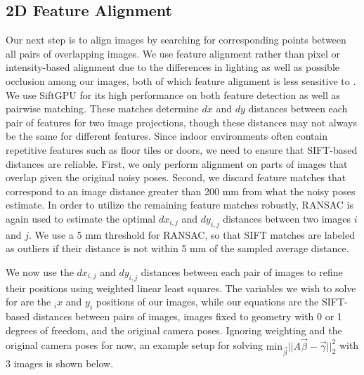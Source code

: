 \documentclass[]{spie}  %
\begin{document}
\subsection{2D Feature Alignment}
\label{sec:robustSIFTFeatureMatching}
Our next step is to align images by searching for corresponding points
between all pairs of overlapping images. We use feature alignment
rather than pixel or intensity-based alignment due to the differences
in lighting as well as possible occlusion among our images, both of
which feature alignment is less sensitive to \cite{lowe1999object,
  mikolajczyk2005performance, szeliski2006image}.  We use SiftGPU
\cite{siftgpu} for its high performance on both feature detection as
well as pairwise matching. These matches determine $dx$ and $dy$
distances between each pair of features for two image projections,
though these distances may not always be the same for different
features. Since indoor environments often contain repetitive features
such as floor tiles or doors, we need to ensure that SIFT-based
distances are reliable. First, we only perform alignment on parts of
images that overlap given the original noisy poses. Second, we discard
feature matches that correspond to an image distance greater than 200
mm from what the noisy poses estimate. In order to utilize the
remaining feature matches robustly, RANSAC \cite{fischler1981random}
is again used to estimate the optimal $dx_{i,j}$ and $dy_{i,j}$
distances between two images $i$ and $j$. We use a 5 mm threshold for
RANSAC, so that SIFT matches are labeled as outliers if their distance
is not within 5 mm of the sampled average distance.


We now use the $dx_{i,j}$ and $dy_{i,j}$ distances between each pair
of images to refine their positions using weighted linear least
squares. The variables we wish to solve for are the $_ix$ and $y_i$
positions of our images, while our equations are the SIFT-based
distances between pairs of images, images fixed to geometry with 0 or
1 degrees of freedom, and the original camera poses. Ignoring
weighting and the original camera poses for now, an example setup for
solving $\textrm{min}_{\vec{\beta}} ||A \vec{\beta} -
\vec{\gamma}||_2^2 $ with 3 images is shown below.
\end{document}
